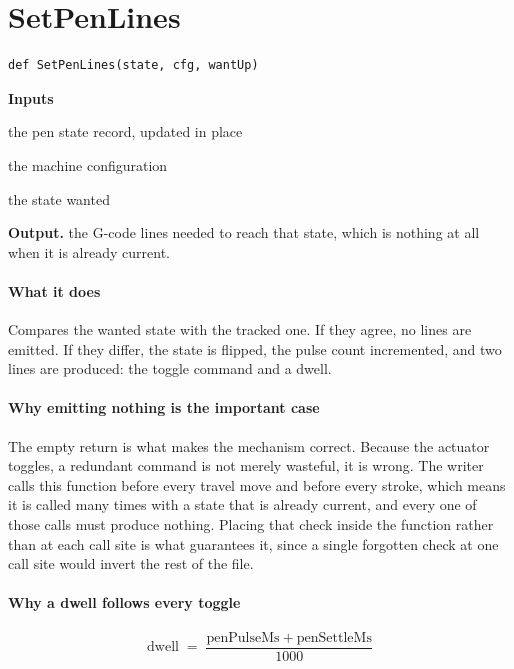 \section{SetPenLines}
\begin{lstlisting}[style=sig]
def SetPenLines(state, cfg, wantUp)
\end{lstlisting}

\noindent\textbf{Inputs}
\begin{description}[leftmargin=2.2em,style=nextline,font=\normalfont\ttfamily]\setlength\itemsep{1pt}
  \item[{state}] \normalfont the pen state record, updated in place
  \item[{cfg}] \normalfont the machine configuration
  \item[{wantUp}] \normalfont the state wanted
\end{description}

\noindent\textbf{Output.} the G-code lines needed to reach that state, which is nothing at all when it is already current.


\paragraph{What it does}
Compares the wanted state with the tracked one. If they agree, no lines are emitted. If they differ, the state is flipped, the pulse count incremented, and two lines are produced: the toggle command and a dwell.


\paragraph{Why emitting nothing is the important case}
The empty return is what makes the mechanism correct. Because the actuator toggles, a redundant command is not merely wasteful, it is wrong. The writer calls this function before every travel move and before every stroke, which means it is called many times with a state that is already current, and every one of those calls must produce nothing. Placing that check inside the function rather than at each call site is what guarantees it, since a single forgotten check at one call site would invert the rest of the file.


\paragraph{Why a dwell follows every toggle}

\begin{equation}
\mathrm{dwell} \;=\; \frac{\mathrm{penPulseMs} + \mathrm{penSettleMs}}{1000}
\end{equation}

